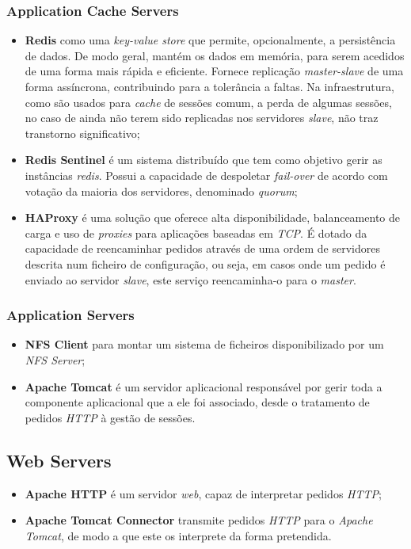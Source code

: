 	\subsubsection{Application Cache Servers}
		\begin{itemize}
			\item \textbf{Redis} como uma \emph{key-value store} que permite, opcionalmente, a persistência de dados. De modo geral, mantém os dados em memória, para serem acedidos de uma forma mais rápida e eficiente. Fornece replicação \emph{master-slave} de uma forma assíncrona, contribuindo para a tolerância a faltas. Na infraestrutura, como são usados para \emph{cache} de sessões comum, a perda de algumas sessões, no caso de ainda não terem sido replicadas nos servidores \emph{slave}, não traz transtorno significativo;
			\item \textbf{Redis Sentinel} é um sistema distribuído que tem como objetivo gerir as instâncias \emph{redis}. Possui a capacidade de despoletar \emph{fail-over} de acordo com votação da maioria dos servidores, denominado \emph{quorum};
			\item \textbf{HAProxy} é uma solução que oferece alta disponibilidade, balanceamento de carga e uso de \emph{proxies} para aplicações baseadas em \emph{TCP}. É dotado da capacidade de reencaminhar pedidos através de uma ordem de servidores descrita num ficheiro de configuração, ou seja, em casos onde um pedido é enviado ao servidor \emph{slave}, este serviço reencaminha-o para o \emph{master}.
		\end{itemize}
	\subsubsection{Application Servers}
		\begin{itemize}
			\item \textbf{NFS Client} para montar um sistema de ficheiros disponibilizado por um \emph{NFS Server};
			\item \textbf{Apache Tomcat} é um servidor aplicacional responsável por gerir toda a componente aplicacional que a ele foi associado, desde o tratamento de pedidos \emph{HTTP} à gestão de sessões.
		\end{itemize}

\subsection{Web Servers}
	\begin{itemize}
		\item \textbf{Apache HTTP} é um servidor \emph{web}, capaz de interpretar pedidos \emph{HTTP};
		\item \textbf{Apache Tomcat Connector} transmite pedidos \emph{HTTP} para o \emph{Apache Tomcat}, de modo a que este os interprete da forma pretendida.
	\end{itemize}


